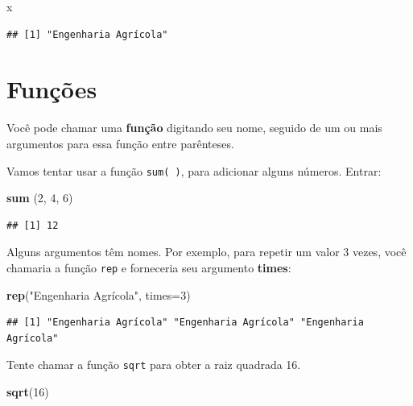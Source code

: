 \documentclass[]{book}
\newenvironment{Shaded}{\begin{snugshade}}{\end{snugshade}}
\newcommand{\DataTypeTok}[1]{\textcolor[rgb]{0.13,0.29,0.53}{#1}}
\newcommand{\DecValTok}[1]{\textcolor[rgb]{0.00,0.00,0.81}{#1}}
\newcommand{\KeywordTok}[1]{\textcolor[rgb]{0.13,0.29,0.53}{\textbf{#1}}}
\newcommand{\NormalTok}[1]{#1}
\newcommand{\StringTok}[1]{\textcolor[rgb]{0.31,0.60,0.02}{#1}}
\begin{document}
\begin{Shaded}
\begin{Highlighting}[]
\NormalTok{x}
\end{Highlighting}
\end{Shaded}

\begin{verbatim}
## [1] "Engenharia Agrícola"
\end{verbatim}

\hypertarget{funcoes}{%
\section{Funções}\label{funcoes}}

Você pode chamar uma \textbf{função} digitando seu nome, seguido de um ou mais argumentos para essa função entre parênteses.

Vamos tentar usar a função \texttt{sum(\ )}, para adicionar alguns números. Entrar:

\begin{Shaded}
\begin{Highlighting}[]
\KeywordTok{sum}\NormalTok{ (}\DecValTok{2}\NormalTok{, }\DecValTok{4}\NormalTok{, }\DecValTok{6}\NormalTok{)}
\end{Highlighting}
\end{Shaded}

\begin{verbatim}
## [1] 12
\end{verbatim}

Alguns argumentos têm nomes. Por exemplo, para repetir um valor 3 vezes, você chamaria a função \texttt{rep} e forneceria seu argumento \textbf{times}:

\begin{Shaded}
\begin{Highlighting}[]
\KeywordTok{rep}\NormalTok{(}\StringTok{"Engenharia Agrícola"}\NormalTok{, }\DataTypeTok{times=}\DecValTok{3}\NormalTok{)}
\end{Highlighting}
\end{Shaded}

\begin{verbatim}
## [1] "Engenharia Agrícola" "Engenharia Agrícola" "Engenharia Agrícola"
\end{verbatim}

Tente chamar a função \texttt{sqrt} para obter a raiz quadrada 16.

\begin{Shaded}
\begin{Highlighting}[]
\KeywordTok{sqrt}\NormalTok{(}\DecValTok{16}\NormalTok{)}
\end{Highlighting}
\end{Shaded}
\end{document}
